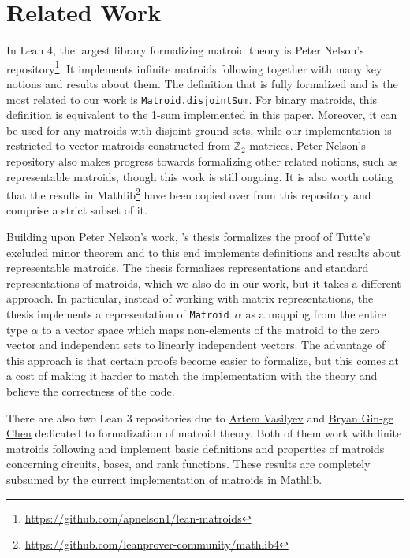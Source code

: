 \section{Related Work}

In Lean 4, the largest library formalizing matroid theory is Peter Nelson's repository\footnote{\url{https://github.com/apnelson1/lean-matroids}}. It implements infinite matroids following \cite{Bruhn2013} together with many key notions and results about them. The definition that is fully formalized and is the most related to our work is \texttt{Matroid.disjointSum}. For binary matroids, this definition is equivalent to the 1-sum implemented in this paper. Moreover, it can be used for any matroids with disjoint ground sets, while our implementation is restricted to vector matroids constructed from $\mathbb{Z}_{2}$ matrices. Peter Nelson's repository also makes progress towards formalizing other related notions, such as representable matroids, though this work is still ongoing. It is also worth noting that the results in Mathlib\footnote{\url{https://github.com/leanprover-community/mathlib4}} have been copied over from this repository and comprise a strict subset of it.

Building upon Peter Nelson's work, \citeauthor{Gusakov2024}'s thesis \cite{Gusakov2024} formalizes the proof of Tutte's excluded minor theorem and to this end implements definitions and results about representable matroids. The thesis formalizes representations and standard representations of matroids, which we also do in our work, but it takes a different approach. In particular, instead of working with matrix representations, the thesis implements a representation of \texttt{Matroid $\alpha$} as a mapping from the entire type $\alpha$ to a vector space which maps non-elements of the matroid to the zero vector and independent sets to linearly independent vectors. The advantage of this approach is that certain proofs become easier to formalize, but this comes at a cost of making it harder to match the implementation with the theory and believe the correctness of the code.

There are also two Lean 3 repositories due to \href{https://github.com/VArtem/lean-matroids}{Artem Vasilyev} and \href{https://github.com/bryangingechen/lean-matroids}{Bryan Gin-ge Chen} dedicated to formalization of matroid theory. Both of them work with finite matroids following \cite{Oxley2011} and implement basic definitions and properties of matroids concerning circuits, bases, and rank functions. These results are completely subsumed by the current implementation of matroids in Mathlib.


